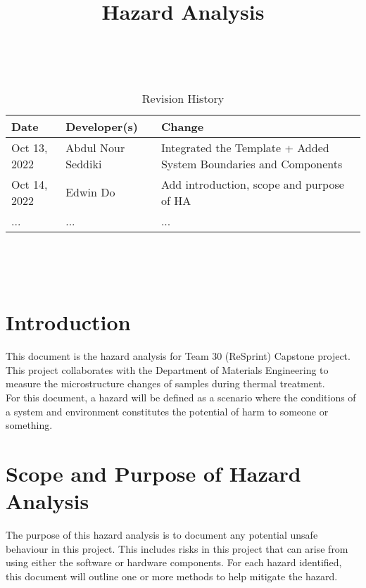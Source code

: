 \documentclass{article}
\title{Hazard Analysis\\\progname}
\author{\authname}
\date{}
\begin{document}
\maketitle
\thispagestyle{empty}

~\newpage


\begin{table}[hp]
\caption{Revision History} \label{TblRevisionHistory}
\begin{tabularx}{\textwidth}{llX}
\toprule
\textbf{Date} & \textbf{Developer(s)} & \textbf{Change}\\
\midrule
Oct 13, 2022 & Abdul Nour Seddiki & Integrated the Template + Added System Boundaries and Components\\
Oct 14, 2022 & Edwin Do & Add introduction, scope and purpose of HA \\
... & ... & ...\\
\bottomrule
\end{tabularx}
\end{table}

~\newpage

\tableofcontents

~\newpage



\section{Introduction}
This document is the hazard analysis for Team 30 (ReSprint) Capstone project. 
This project collaborates with the Department of Materials Engineering to measure the microstructure changes of samples during thermal treatment.\\

\noindent For this document, a hazard will be defined as 
a scenario where the conditions of a system and environment constitutes the potential of harm to someone or something.

\section{Scope and Purpose of Hazard Analysis}
The purpose of this hazard analysis is to document any potential unsafe behaviour in this project. 
This includes risks in this project that can arise from using either the software or hardware components.
For each hazard identified, this document will outline one or more methods to help mitigate the hazard.\\
\end{document}
